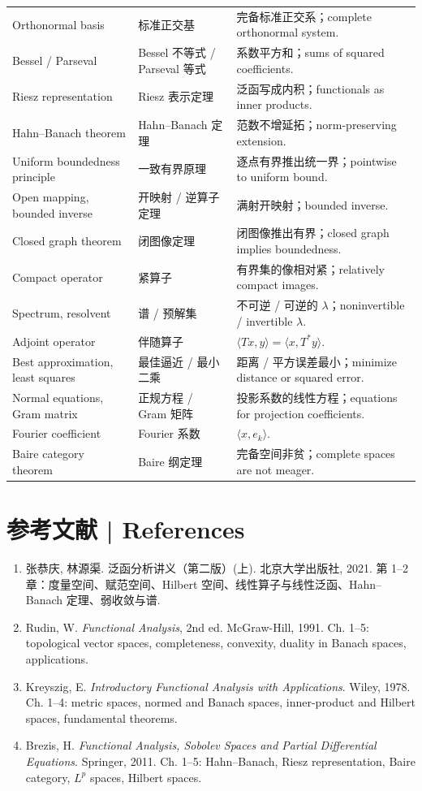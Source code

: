 \documentclass[UTF8,11pt,a4paper]{ctexart}
\begin{document}
\begin{longtable}{@{}p{3.6cm}p{3.0cm}p{8.8cm}@{}}
Orthonormal basis & 标准正交基 & 完备标准正交系；complete orthonormal system. \\
Bessel / Parseval & Bessel 不等式 / Parseval 等式 & 系数平方和；sums of squared coefficients. \\
Riesz representation & Riesz 表示定理 & 泛函写成内积；functionals as inner products. \\
Hahn--Banach theorem & Hahn--Banach 定理 & 范数不增延拓；norm-preserving extension. \\
Uniform boundedness principle & 一致有界原理 & 逐点有界推出统一界；pointwise to uniform bound. \\
Open mapping, bounded inverse & 开映射 / 逆算子定理 & 满射开映射；bounded inverse. \\
Closed graph theorem & 闭图像定理 & 闭图像推出有界；closed graph implies boundedness. \\
Compact operator & 紧算子 & 有界集的像相对紧；relatively compact images. \\
Spectrum, resolvent & 谱 / 预解集 & 不可逆 / 可逆的 $\lambda$；noninvertible / invertible $\lambda$. \\
Adjoint operator & 伴随算子 & $\langle Tx,y\rangle=\langle x,T^*y\rangle$. \\
Best approximation, least squares & 最佳逼近 / 最小二乘 & 距离 / 平方误差最小；minimize distance or squared error. \\
Normal equations, Gram matrix & 正规方程 / Gram 矩阵 & 投影系数的线性方程；equations for projection coefficients. \\
Fourier coefficient & Fourier 系数 & $\langle x,e_k\rangle$. \\
Baire category theorem & Baire 纲定理 & 完备空间非贫；complete spaces are not meager. \\
\bottomrule
\end{longtable}
\endgroup

\clearpage
{}
\section*{参考文献 | References}
\begingroup\small
\begin{enumerate}[leftmargin=2em,itemsep=1pt,topsep=2pt]
\item 张恭庆, 林源渠. 泛函分析讲义（第二版）(上). 北京大学出版社, 2021. 第 1--2 章：度量空间、赋范空间、Hilbert 空间、线性算子与线性泛函、Hahn--Banach 定理、弱收敛与谱.
\item Rudin, W. \emph{Functional Analysis}, 2nd ed. McGraw-Hill, 1991. Ch. 1--5: topological vector spaces, completeness, convexity, duality in Banach spaces, applications.
\item Kreyszig, E. \emph{Introductory Functional Analysis with Applications}. Wiley, 1978. Ch. 1--4: metric spaces, normed and Banach spaces, inner-product and Hilbert spaces, fundamental theorems.
\item Brezis, H. \emph{Functional Analysis, Sobolev Spaces and Partial Differential Equations}. Springer, 2011. Ch. 1--5: Hahn--Banach, Riesz representation, Baire category, $L^p$ spaces, Hilbert spaces.
\end{enumerate}
\endgroup
\end{document}
